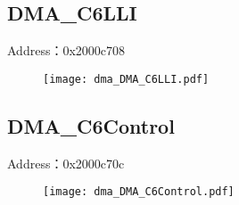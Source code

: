 \subsection{DMA\_C6LLI}
\label{dma-DMA-C6LLI}
Address：0x2000c708
 \begin{figure}[H]
\texttt{[image: dma\_DMA\_C6LLI.pdf]}
\end{figure}

\subsection{DMA\_C6Control}
\label{dma-DMA-C6Control}
Address：0x2000c70c
 \begin{figure}[H]
\texttt{[image: dma\_DMA\_C6Control.pdf]}
\end{figure}

